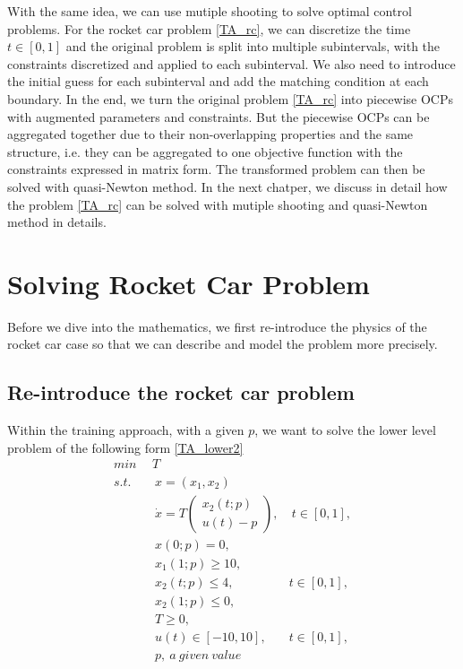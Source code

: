 	
	With the same idea, we can use mutiple shooting to solve optimal control problems. For the rocket car problem \ref{TA_rc}, we can discretize the time $t \in [0, 1]$ and the original problem is split into multiple subintervals, with the constraints discretized and applied to each subinterval. We also need to introduce the initial guess for each subinterval and add the matching condition at each boundary. In the end, we turn the original problem  \ref{TA_rc} into piecewise OCPs with augmented parameters and constraints. But the piecewise OCPs can be aggregated together due to their non-overlapping properties and the same structure, i.e. they can be aggregated to one objective function with the constraints expressed in matrix form. The transformed problem can then be solved with quasi-Newton method. In the next chatper, we discuss in detail how the problem \ref{TA_rc} can be solved with mutiple shooting and quasi-Newton method in details. 
	
	
	\chapter{Solving Rocket Car Problem}
	Before we dive into the mathematics, we first re-introduce the physics of the rocket car case so that we can describe and model the problem more precisely. 
	\section{Re-introduce the rocket car problem}
	Within the training approach, with a given $p$, we want to solve the lower level problem of the following form \ref{TA_lower2}
	\begin{subequations}
		\begin{align}
			\underset{}{min} \   & \  T \\ 
			s.t.  & \ \ x = (x_1, x_2)   \label{ta_rc_x} \\ 
			& \ \  \dot{x} = T  \begin{pmatrix}  x_2(t;p) \\ u(t)-p   \end{pmatrix}, & \ t \in [0,1],  \label{ta_rc_partial2} \\
			& \ \ x(0;p) = 0, \label{ta_rc_t2}\\
			& \ \ x_1(1;p) \geq 10, \label{ta_rc_x1_t2} \\
			& \ \ x_2(t;p) \leq 4, & t \in [0,1], \label{ta_rc_x2_tc2} \\
			& \ \ x_2(1;p) \leq 0, \label{ta_rc_x2_t1_2}  \\
			& \ \ T \geq 0, \\
			& \ \ u(t) \in [-10, 10], & t \in [0,1], \label{ta_ut}\\
			& \ \ p, \   a \ given \ value
		\end{align}
		\label{TA_lower2}
	\end{subequations}
	
